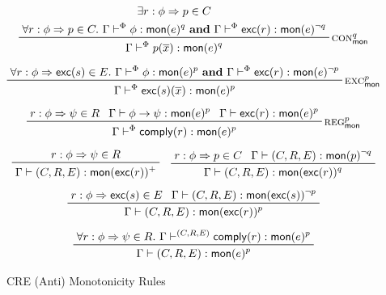 \begin{figure}
    \begin{gather*}
    \prftree[r] {$\textsc{con}^q_\mathsf{mon}$}
        {
            \prfStackPremises
            {\exists r : \phi \Rightarrow p \in C}
            {\forall r : \phi \Rightarrow p \in C.~
                \Gamma \vdash^\Phi \phi : \mono{e} ^q~
                \textbf{and}~\Gamma \vdash^\Phi \exc(r) : \mono{e}^{\neg q}}
        }
        {\Gamma \vdash^\Phi p(\overline{x}) : \mono{e}^q} \\[5pt]
    \prftree[r] {$\textsc{exc}^p_\mathsf{mon}$}
        {\forall r : \phi \Rightarrow \exc(s) \in E.~
        \Gamma \vdash^\Phi \phi : \mono{e}^p~
        \textbf{and}~\Gamma \vdash^\Phi \exc(r) : \mono{e}^{\neg p}}
        {\Gamma \vdash^\Phi \exc(s)(\overline{x}) : \mono{e}^p} \\[5pt]
    \prftree[r] {$\textsc{reg}^p_\mathsf{mon}$}
        {r: \phi \Rightarrow \psi \in R}
        {\Gamma \vdash \phi \to \psi : \mono{e}^p}
        {\Gamma \vdash \exc(r) : \mono{e}^p}
        {\Gamma \vdash^\Phi \comply(r) : \mono{e}^p} \\[5pt]
    \prftree {r: \phi \Rightarrow \psi \in R}
        {\Gamma \vdash (C,R,E) : \mono{\exc(r)}^+} \quad
    \prftree {r: \phi \Rightarrow p \in C}
        {\Gamma \vdash (C,R,E) : \mono{p}^{\neg q}}
        {\Gamma \vdash (C,R,E) : \mono{\exc(r)}^q} \\[5pt]
    \prftree {r: \phi \Rightarrow \exc(s) \in E}
        {\Gamma \vdash (C,R,E) : \mono{\exc(s)}^{\neg p}}
        {\Gamma \vdash (C,R,E) : \mono{\exc(r)}^p} \\[5pt]
    \prftree {\forall r: \phi \Rightarrow \psi \in R.~
        \Gamma \vdash^{(C,R,E)} \comply(r) : \mono{e}^p }
        {\Gamma \vdash (C,R,E) : \mono{e}^p}
    \end{gather*}
    \vspace{-2em}
    \caption{CRE (Anti) Monotonicity Rules \cite[Appendix A]{lex}}
    \label{fig:cre-monotonicity-rules}
\end{figure}

